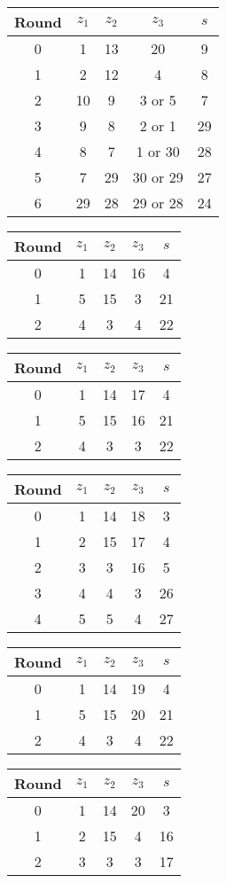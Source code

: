 \begin{multicols}{2}
\begin{tabular}{c | c | c | c | c }
Round & $z_1$ & $z_2$ & $z_3$ & $s$ \\
\hline
0 & 1 & 13 & 20 & 9 \\
1 & 2 & 12 & 4 & 8 \\
2 & 10 & 9 & 3 or 5 & 7 \\
3 & 9 & 8 & 2 or 1 & 29 \\
4 & 8 & 7 & 1 or 30 & 28 \\
5 & 7 & 29 & 30 or 29 & 27 \\
6 & 29 & 28 & 29 or 28 & 24
\end{tabular}


\begin{tabular}{c | c | c | c | c }
Round & $z_1$ & $z_2$ & $z_3$ & $s$ \\
\hline
0 & 1 & 14 & 16 & 4 \\
1 & 5 & 15 & 3 & 21 \\
2 & 4 & 3 & 4 & 22
\end{tabular}


\begin{tabular}{c | c | c | c | c }
Round & $z_1$ & $z_2$ & $z_3$ & $s$ \\
\hline
0 & 1 & 14 & 17 & 4 \\
1 & 5 & 15 & 16 & 21 \\
2 & 4 & 3 & 3 & 22
\end{tabular}


\begin{tabular}{c | c | c | c | c }
Round & $z_1$ & $z_2$ & $z_3$ & $s$ \\
\hline
0 & 1 & 14 & 18 & 3 \\
1 & 2 & 15 & 17 & 4 \\
2 & 3 & 3 & 16 & 5 \\
3 & 4 & 4 & 3 & 26 \\
4 & 5 & 5 & 4 & 27
\end{tabular}


\begin{tabular}{c | c | c | c | c }
Round & $z_1$ & $z_2$ & $z_3$ & $s$ \\
\hline
0 & 1 & 14 & 19 & 4 \\
1 & 5 & 15 & 20 & 21 \\
2 & 4 & 3 & 4 & 22
\end{tabular}


\begin{tabular}{c | c | c | c | c }
Round & $z_1$ & $z_2$ & $z_3$ & $s$ \\
\hline
0 & 1 & 14 & 20 & 3 \\
1 & 2 & 15 & 4 & 16 \\
2 & 3 & 3 & 3 & 17
\end{tabular}



\end{multicols}
